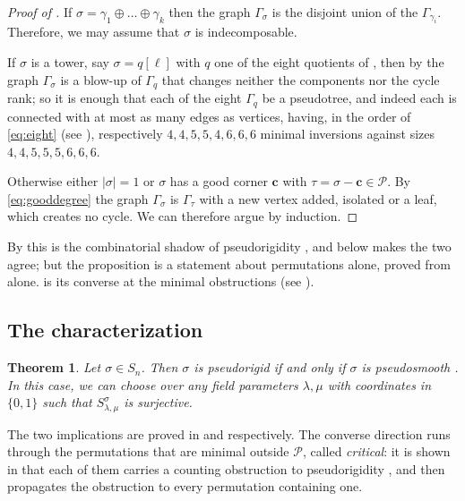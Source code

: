 \documentclass[12pt]{article}
\def\xspace{ }%
\newtheorem{theorem}{Theorem}[section]
\theoremstyle{definition}
\newcommand{\prig}{pseudorigid\xspace}
\newcommand{\prigity}{pseudorigidity\xspace}
\newcommand{\psm}{pseudosmooth\xspace}
\newcommand{\good}{good\xspace}
\newcommand{\Sop}{S}
\newcommand{\PA}{\mathcal{P}}          %
\newcommand{\crn}{\mathbf{c}}              %
\newcommand{\cgr}{\Gamma}                 %
\begin{document}
\begin{proof}[Proof of ]
If $\sigma = \gamma_1 \oplus \dots \oplus \gamma_k$ then the graph $\cgr_\sigma$ is the disjoint union of the
$\cgr_{\gamma_i}$. Therefore, we may assume that $\sigma$ is indecomposable.

If $\sigma$ is a tower, say $\sigma = q[\ell]$ with $q$ one of the eight
quotients of , then by
 the graph $\cgr_\sigma$ is a
blow-up of $\cgr_q$ that changes neither the components nor the cycle
rank; so it is enough that each of the eight $\cgr_q$ be a pseudotree,
and indeed each is connected with at most as many edges as vertices,
having, in the order of \eqref{eq:eight} (see ), respectively $4,4,5,5,4,6,6,6$ minimal
inversions against sizes $4,4,5,5,5,6,6,6$.

Otherwise either $|\sigma|=1$ or $\sigma$ has a \good corner $\crn$ with $\tau = \sigma - \crn
\in \PA$. By \eqref{eq:gooddegree} the graph $\cgr_\sigma$ is
$\cgr_\tau$ with a new vertex added, isolated or a leaf, which creates no
cycle. We can therefore argue by induction.
\end{proof}

By  this is the combinatorial shadow of \prigity, and
 below makes the two agree; but the proposition is a
statement about permutations alone, proved from  alone.
 is its converse at the minimal obstructions (see ).

\subsection{The characterization}\label{ssec:mainthm}

\begin{theorem}\label{thm:mainA}
Let $\sigma \in S_n$. Then $\sigma$ is \prig if and only if $\sigma$ is \psm.
In this case, we can choose over any field parameters $\lambda,\mu$ with coordinates in $\{0,1\}$ such that
$\Sop^\sigma_{\lambda,\mu}$ is surjective.
\end{theorem}

The two implications are proved in  and
 respectively. The converse direction runs through the
permutations that are minimal outside $\PA$, called \emph{critical}: it
is shown in  that each of them carries a counting
obstruction to \prigity, and  then propagates the
obstruction to every permutation containing one.
\end{document}
